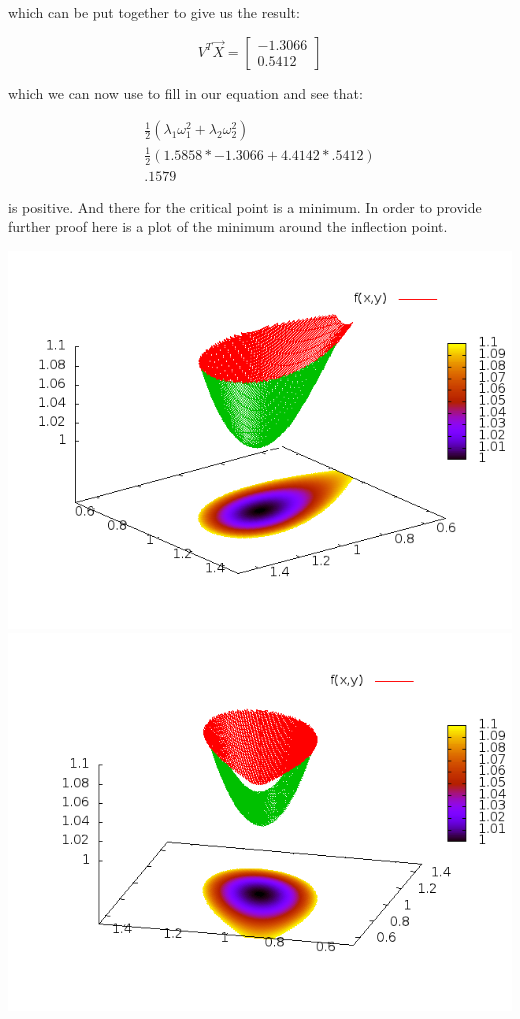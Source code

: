 \documentclass[12pt]{article}
\begin{document}
which can be put together to give us the result:

\[
V^{T}\vec{X} = 
\begin{bmatrix}
 -1.3066\\
    0.5412
\end{bmatrix}
\]

which we can now use to fill in our equation and see that:

\begin{eqnarray}
\frac{1}{2}( \lambda_{1} \omega_{1}^{2} + \lambda_{2} \omega_{2}^{2} )\\
\frac{1}{2}(1.5858*-1.3066 + 4.4142*.5412 )\\
.1579
\end{eqnarray}

is positive. And there for the critical point is a minimum. In order to provide further proof here is a plot of the minimum around the inflection point.

\includegraphics[scale=.5]{Minplot.png}\\
\includegraphics[scale=.5]{Minplot2.png}
\end{document}
